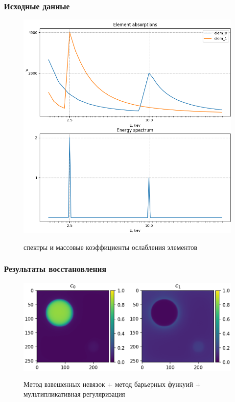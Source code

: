 \documentclass[12pt]{beamer}
\begin{document}
\begin{frame}
\frametitle{Исходные данные}
\begin{figure}

\centering
\includegraphics[height=0.7\textheight]{../Dissertation/images/part3_img/synth_spectre}
\\
\caption{спектры и массовые коэффициенты ослабления элементов}
\end{figure}

\end{frame}

\begin{frame}
\frametitle{Результаты восстановления}
\begin{figure}
\centering
\includegraphics[width=\textwidth]{whiterec_res}
\\
\caption{Метод взвешенных невязок + метод барьерных функуий + мультипликативная регуляризация}
\end{figure}
\end{frame}
\end{document}
